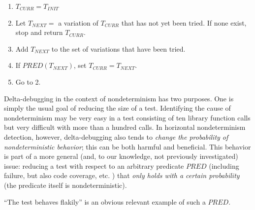 \begin{enumerate}
\item $T_{\mathit{CURR}} = T_{\mathit{INIT}}$
\item Let $T_{\mathit{NEXT}} =$ a variation of $T_{\mathit{CURR}}$
  that has not yet been tried.  If none exist, stop and return $T_{\mathit{CURR}}$.
\item Add $T_{\mathit{NEXT}}$ to the set of variations that have been
  tried.
\item If $\mathit{PRED}(T_{\mathit{NEXT}})$, set $T_{\mathit{CURR}} =
  T_{\mathit{NEXT}}$.
\item Go to 2.
\end{enumerate}

Delta-debugging in the context of nondeterminism has two
purposes.  One is simply the usual goal of reducing the size of a
test.  Identifying the cause of nondeterminism may be very easy in a
test consisting of ten library function calls but very difficult with
more than a hundred calls.  In horizontal nondeterminism detection, however,
delta-debugging also tends to \emph{change the probability of
  nondeterministic behavior}; this can be both harmful and
beneficial.  This behavior is part of a more general (and, to our
knowledge, not previously investigated) issue: reducing a test with
respect to an arbitrary predicate $\mathit{PRED}$ (including failure,
but also code coverage, etc. \cite{stvrcausereduce}) that \emph{only holds with a
certain probability} (the predicate itself is nondeterministic).

``The test behaves flakily'' is an obvious relevant example of such a $\mathit{PRED}$.

